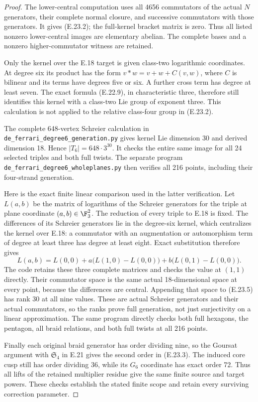 \begin{proof}
The lower-central computation
uses all 4656 commutators
of the actual $N$ generators,
their complete normal closure,
and successive commutators
with those generators.
It gives (E.23.2); the
full-kernel bracket matrix
is zero. Thus all listed
nonzero lower-central images
are elementary abelian.
The complete bases and a
nonzero higher-commutator
witness are retained.

Only the kernel over the
E.18 target is given
class-two logarithmic
coordinates. At degree six
its product has the form
$v*w=v+w+C(v,w)$, where
$C$ is bilinear and its
terms have degrees five
or six. A further cross
term has degree at least
seven. The exact formula
(E.22.9), in characteristic
three, therefore still
identifies this kernel
with a class-two Lie
group of exponent three.
This calculation is not
applied to the relative
class-four group in
(E.23.2).

The complete 648-vertex
Schreier calculation in
\texttt{de\_ferrari\_degree6\_generation.py}
gives kernel Lie dimension
30 and derived dimension
18. Hence $|T_6|=648\cdot3^{30}$.
It checks the entire same
image for all 24 selected
triples and both full
twists. The separate program
\texttt{de\_ferrari\_degree6\_wholeplanes.py}
then verifies all 216
points, including their
four-strand generation.

Here is the exact finite
linear comparison used in
the latter verification.
Let $L(a,b)$ be the matrix
of logarithms of the
Schreier generators for
the triple at plane
coordinate $(a,b)\in\F_3^2$.
The reduction of every
triple to E.18 is fixed.
The differences of its
Schreier generators lie
in the degree-six kernel,
which centralizes the
kernel over E.18: a
commutator with an
augmentation or automorphism
term of degree at least
three has degree at
least eight. Exact
substitution therefore gives
\[
 L(a,b)=L(0,0)
       +a\bigl(L(1,0)-L(0,0)\bigr)
       +b\bigl(L(0,1)-L(0,0)\bigr).
 \tag{E.23.5}
\]
The code retains these
three complete matrices
and checks the value at
$(1,1)$ directly. Their
commutator space is the
same actual 18-dimensional
space at every point,
because the differences
are central. Appending
that space to (E.23.5)
has rank 30 at all nine
values. These are actual
Schreier generators and
their actual commutators,
so the ranks prove full
generation, not just
surjectivity on a linear
approximation. The same
program directly checks
both full hexagons, the
pentagon, all braid
relations, and both full
twists at all 216 points.

Finally each original
braid generator has order
dividing nine, so the
Goursat argument with
$\mathfrak S_4$ in E.21
gives the second order
in (E.23.3). The induced
core cusp still has order
dividing 36, while its
$G_6$ coordinate has
exact order 72. Thus
all lifts of the retained
multiplier residue give
the same finite source
and target powers.
These checks establish
the stated finite scope
and retain every surviving
correction parameter.
\end{proof}
